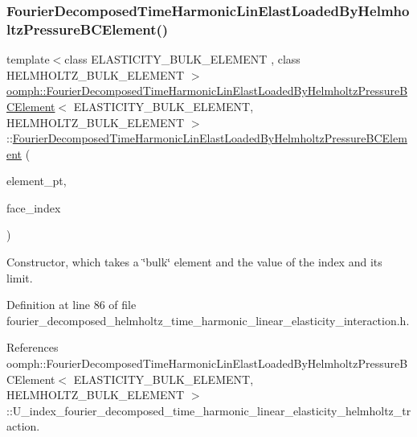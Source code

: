 \subsubsection{\texorpdfstring{Fourier\+Decomposed\+Time\+Harmonic\+Lin\+Elast\+Loaded\+By\+Helmholtz\+Pressure\+B\+C\+Element()}{FourierDecomposedTimeHarmonicLinElastLoadedByHelmholtzPressureBCElement()}}
{\footnotesize\ttfamily template$<$class E\+L\+A\+S\+T\+I\+C\+I\+T\+Y\+\_\+\+B\+U\+L\+K\+\_\+\+E\+L\+E\+M\+E\+NT , class H\+E\+L\+M\+H\+O\+L\+T\+Z\+\_\+\+B\+U\+L\+K\+\_\+\+E\+L\+E\+M\+E\+NT $>$ \\
\hyperlink{classoomph_1_1FourierDecomposedTimeHarmonicLinElastLoadedByHelmholtzPressureBCElement}{oomph\+::\+Fourier\+Decomposed\+Time\+Harmonic\+Lin\+Elast\+Loaded\+By\+Helmholtz\+Pressure\+B\+C\+Element}$<$ E\+L\+A\+S\+T\+I\+C\+I\+T\+Y\+\_\+\+B\+U\+L\+K\+\_\+\+E\+L\+E\+M\+E\+NT, H\+E\+L\+M\+H\+O\+L\+T\+Z\+\_\+\+B\+U\+L\+K\+\_\+\+E\+L\+E\+M\+E\+NT $>$\+::\hyperlink{classoomph_1_1FourierDecomposedTimeHarmonicLinElastLoadedByHelmholtzPressureBCElement}{Fourier\+Decomposed\+Time\+Harmonic\+Lin\+Elast\+Loaded\+By\+Helmholtz\+Pressure\+B\+C\+Element} (\begin{DoxyParamCaption}\item[{Finite\+Element $\ast$const \&}]{element\+\_\+pt,  }\item[{const int \&}]{face\+\_\+index }\end{DoxyParamCaption})\hspace{0.3cm}{\ttfamily [inline]}}



Constructor, which takes a \char`\"{}bulk\char`\"{} element and the value of the index and its limit. 



Definition at line 86 of file fourier\+\_\+decomposed\+\_\+helmholtz\+\_\+time\+\_\+harmonic\+\_\+linear\+\_\+elasticity\+\_\+interaction.\+h.



References oomph\+::\+Fourier\+Decomposed\+Time\+Harmonic\+Lin\+Elast\+Loaded\+By\+Helmholtz\+Pressure\+B\+C\+Element$<$ E\+L\+A\+S\+T\+I\+C\+I\+T\+Y\+\_\+\+B\+U\+L\+K\+\_\+\+E\+L\+E\+M\+E\+N\+T, H\+E\+L\+M\+H\+O\+L\+T\+Z\+\_\+\+B\+U\+L\+K\+\_\+\+E\+L\+E\+M\+E\+N\+T $>$\+::\+U\+\_\+index\+\_\+fourier\+\_\+decomposed\+\_\+time\+\_\+harmonic\+\_\+linear\+\_\+elasticity\+\_\+helmholtz\+\_\+traction.



